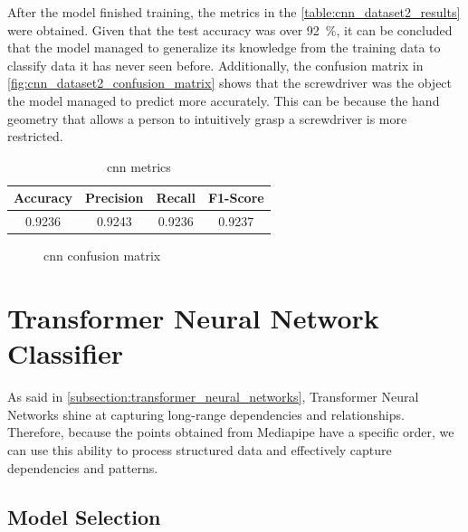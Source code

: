 After the model finished training, the metrics in the \autoref{table:cnn_dataset2_results} were obtained. Given that the test accuracy was over \SI{92}{\percent}, it can be concluded that the model managed to generalize its knowledge from the training data to classify data it has never seen before. Additionally, the confusion matrix in \autoref{fig:cnn_dataset2_confusion_matrix} shows that the screwdriver was the object the model managed to predict more accurately. This can be because the hand geometry that allows a person to intuitively grasp a screwdriver is more restricted.

\begin{table}[ht]
    \centering
    \caption{\acs{cnn} metrics}
    \label{table:cnn_dataset2_results}
    \begin{tabular}{cccc}
        \toprule
        Accuracy & Precision & Recall & F1-Score \\
        \midrule
        0.9236 & 0.9243 & 0.9236 & 0.9237 \\
        \bottomrule
    \end{tabular}
\end{table}

\begin{figure}[ht]
    \centering
    {\fontsize{10}{12}\selectfont}
    \caption{\acs{cnn} confusion matrix}
    \label{fig:cnn_dataset2_confusion_matrix}
\end{figure}

\section{Transformer Neural Network Classifier}
\label{section:transformer_classifier}

As said in \autoref{subsection:transformer_neural_networks}, Transformer Neural Networks shine at capturing long-range dependencies and relationships. Therefore, because the points obtained from Mediapipe have a specific order, we can use this ability to process structured data and effectively capture dependencies and patterns.

\subsection{Model Selection}


